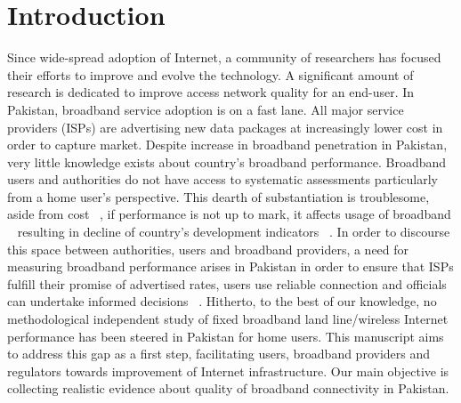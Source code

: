 \documentclass{sig-alternate-10pt}
\begin{document}
\begin{sloppypar}
\section{Introduction}
\indent Since wide-spread adoption of Internet, a community of researchers has focused their efforts to improve and evolve the technology. A significant amount of research is dedicated to improve access network quality for an end-user. In Pakistan, broadband service adoption is on a fast lane. All major service providers (ISPs) are advertising new data packages at increasingly lower cost in order to capture market. Despite increase in broadband penetration in Pakistan, very little knowledge exists about country's broadband performance. Broadband users and authorities do not have access to systematic assessments particularly from a home user's perspective. This dearth of substantiation is troublesome, aside from cost ~\cite{chetty:cap}, if performance is not up to mark, it affects usage of broadband ~\cite{10,25}  resulting in decline of country's development indicators ~\cite {24}. In order to discourse this space between authorities, users and broadband providers, a need for measuring broadband performance arises in Pakistan in order to ensure that ISPs fulfill their promise of advertised rates, users use reliable connection and officials can undertake informed decisions ~\cite{12,15,16}. Hitherto, to the best of our knowledge, no methodological independent study of fixed broadband land line/wireless Internet performance has been steered in Pakistan for home users. This manuscript aims to address this gap as a first step, facilitating users, broadband providers and regulators towards improvement of Internet infrastructure. Our main objective is collecting realistic evidence about quality of broadband connectivity in Pakistan.


\end{sloppypar}
\end{document}
